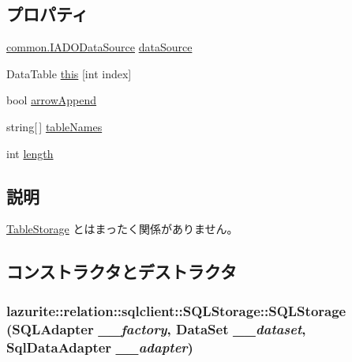 \subsection*{プロパティ}
\begin{DoxyCompactItemize}
\item 
\hyperlink{interfacelazurite_1_1relation_1_1common_1_1_i_a_d_o_data_source}{common.IADODataSource} \hyperlink{classlazurite_1_1relation_1_1sqlclient_1_1_s_q_l_storage_a3ed27c030a7fbff731edbcc65c7f324e}{dataSource}
\item 
DataTable \hyperlink{classlazurite_1_1relation_1_1sqlclient_1_1_s_q_l_storage_acee858e25cf0ef20c657b89842fa9730}{this} \mbox{[}int index\mbox{]}
\item 
bool \hyperlink{classlazurite_1_1relation_1_1sqlclient_1_1_s_q_l_storage_a1d90faa9bc618b3575713adb41ff7778}{arrowAppend}
\item 
string\mbox{[}$\,$\mbox{]} \hyperlink{classlazurite_1_1relation_1_1sqlclient_1_1_s_q_l_storage_a6a10ad962b51ba757b4664e397a8e31d}{tableNames}
\item 
int \hyperlink{classlazurite_1_1relation_1_1sqlclient_1_1_s_q_l_storage_a545b620205815ab5d91fddf3910eed88}{length}
\end{DoxyCompactItemize}


\subsection{説明}
\hyperlink{classlazurite_1_1relation_1_1_table_storage}{TableStorage} とはまったく関係がありません。 

\subsection{コンストラクタとデストラクタ}
\hypertarget{classlazurite_1_1relation_1_1sqlclient_1_1_s_q_l_storage_a3352630f64bb6e7bcb4c1aed5cbec745}{
\subsubsection[{SQLStorage}]{\setlength{\rightskip}{0pt plus 5cm}lazurite::relation::sqlclient::SQLStorage::SQLStorage ({\bf SQLAdapter} {\em \_\-\_\-factory}, \/  DataSet {\em \_\-\_\-dataset}, \/  SqlDataAdapter {\em \_\-\_\-adapter})}}
\label{classlazurite_1_1relation_1_1sqlclient_1_1_s_q_l_storage_a3352630f64bb6e7bcb4c1aed5cbec745}


